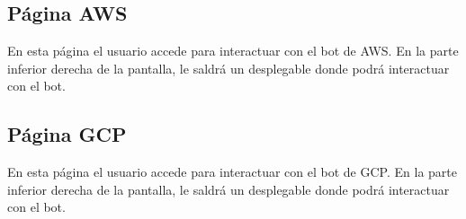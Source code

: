 \subsection{Página AWS}
En esta página el usuario accede para interactuar con el bot de AWS. En la parte inferior derecha de la pantalla, le saldrá un desplegable donde podrá interactuar con el bot.

\subsection{Página GCP}
En esta página el usuario accede para interactuar con el bot de GCP. En la parte inferior derecha de la pantalla, le saldrá un desplegable donde podrá interactuar con el bot.

